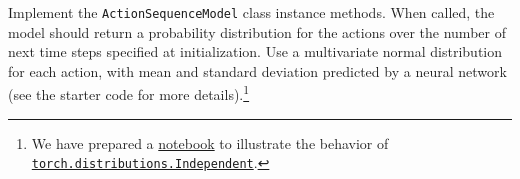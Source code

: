 \item {}

Implement the \texttt{ActionSequenceModel} class instance methods. When called, the model should return a probability distribution for the actions over the number of next time steps specified at initialization. Use a multivariate normal distribution for each action, with mean and standard deviation predicted by a neural network (see the starter code for more details).\footnote{We have prepared a \href{https://colab.research.google.com/drive/1ChB5-epdpYsDPwp48m5UJ-5KH0Ge2V1g?usp=share_link}{notebook} to illustrate the behavior of \href{https://pytorch.org/docs/stable/distributions.html\#independent}{\texttt{torch.distributions.Independent}}.}